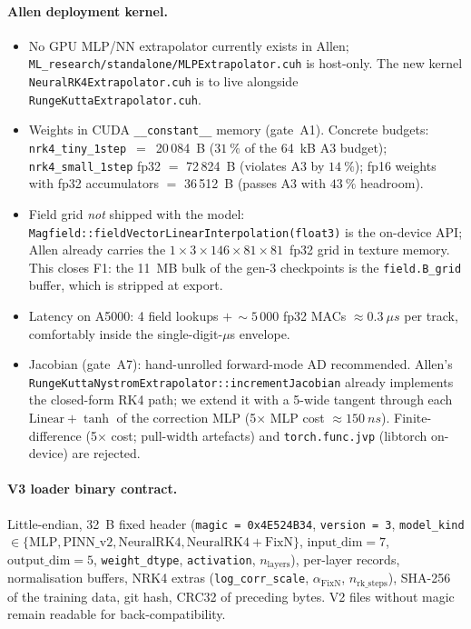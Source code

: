 \documentclass[a4paper,11pt]{article}
\newcommand{\SI}[2]{#1~#2}
\begin{document}
\paragraph{Allen deployment kernel.}
\begin{itemize}\setlength{\itemsep}{0pt}
  \item No GPU MLP/NN extrapolator currently exists in Allen;
        \texttt{ML\_research/standalone/MLPExtrapolator.cuh} is
        host-only.  The new kernel
        \texttt{NeuralRK4Extrapolator.cuh} is to live alongside
        \texttt{RungeKuttaExtrapolator.cuh}.
  \item Weights in CUDA \texttt{\_\_constant\_\_} memory (gate~A1).
        Concrete budgets:
        \texttt{nrk4\_tiny\_1step}\ $=$\ 20\,084~B
        ($\SI{31}{\percent}$ of the \SI{64}{kB} A3 budget);
        \texttt{nrk4\_small\_1step} fp32 $=$ 72\,824~B
        (violates A3 by $\SI{14}{\percent}$); fp16 weights
        with fp32 accumulators $=$ 36\,512~B (passes A3 with
        $\SI{43}{\percent}$ headroom).
  \item Field grid \emph{not} shipped with the model:
        \texttt{Magfield::fieldVectorLinearInterpolation(float3)}
        is the on-device API; Allen already carries the
        $1{\times}3{\times}146{\times}81{\times}81$~fp32 grid
        in texture memory.  This closes F1: the \SI{11}{MB} bulk
        of the gen-3 checkpoints is the
        \texttt{field.B\_grid} buffer, which is stripped at
        export.
  \item Latency on A5000: 4 field lookups $+\,\sim\!5\,000$
        fp32 MACs $\approx \SI{0.3}{\mu s}$ per track,
        comfortably inside the single-digit-$\mu$s envelope.
  \item Jacobian (gate~A7): hand-unrolled forward-mode AD
        recommended.  Allen's
        \texttt{RungeKuttaNystromExtrapolator::incrementJacobian}
        already implements the closed-form RK4 path; we extend it
        with a 5-wide tangent through each $\mathrm{Linear}+\tanh$
        of the correction MLP (5$\times$ MLP cost
        $\approx\SI{150}{ns}$).  Finite-difference (5$\times$
        cost; pull-width artefacts) and \texttt{torch.func.jvp}
        (libtorch on-device) are rejected.
\end{itemize}

\paragraph{V3 loader binary contract.}  Little-endian, 32~B fixed
header (\texttt{magic = 0x4E524B34}, \texttt{version = 3},
\texttt{model\_kind} $\in\{\mathrm{MLP},\mathrm{PINN\_v2},\mathrm{NeuralRK4},\mathrm{NeuralRK4{+}FixN}\}$,
$\mathrm{input\_dim}=7$, $\mathrm{output\_dim}=5$,
\texttt{weight\_dtype}, \texttt{activation},
$n_\mathrm{layers}$), per-layer records, normalisation buffers,
NRK4 extras (\texttt{log\_corr\_scale},
$\alpha_\mathrm{FixN}$, $n_\mathrm{rk\_steps}$), SHA-256 of the
training data, git hash, CRC32 of preceding bytes.  V2 files
without magic remain readable for back-compatibility.
\end{document}
